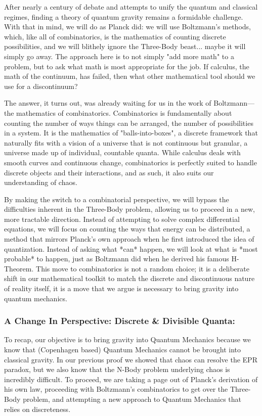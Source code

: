 \documentclass{article}
\begin{document}
After nearly a century of debate and attempts to unify the quantum and classical regimes, finding a theory of quantum gravity remains a formidable challenge. With that in mind, we will do as Planck did: we will use Boltzmann's methods, which, like all of combinatorics, is the mathematics of counting discrete possibilities, and we will blithely ignore the Three-Body beast... maybe it will simply go away. The approach here is to not simply "add more math" to a problem, but to ask what math is most appropriate for the job. If calculus, the math of the continuum, has failed, then what other mathematical tool should we use for a discontinuum?

The answer, it turns out, was already waiting for us in the work of Boltzmann—the mathematics of combinatorics. Combinatorics is fundamentally about counting the number of ways things can be arranged, the number of possibilities in a system. It is the mathematics of "balls-into-boxes", a discrete framework that naturally fits with a vision of a universe that is not continuous but granular, a universe made up of individual, countable quanta. While calculus deals with smooth curves and continuous change, combinatorics is perfectly suited to handle discrete objects and their interactions, and as such, it also suits our understanding of chaos.

By making the switch to a combinatorial perspective, we will bypass the difficulties inherent in the Three-Body problem, allowing us to proceed in a new, more tractable direction. Instead of attempting to solve complex differential equations, we will focus on counting the ways that energy can be distributed, a method that mirrors Planck's own approach when he first introduced the idea of quantization. Instead of asking what *can* happen, we will look at what is *most probable* to happen, just as Boltzmann did when he derived his famous H-Theorem. This move to combinatorics is not a random choice; it is a deliberate shift in our mathematical toolkit to match the discrete and discontinuous nature of reality itself, it is a move that we argue is necessary to bring gravity into quantum mechanics.

\subsubsection*{A Change In Perspective: Discrete \& Divisible Quanta:}
To recap, our objective is to bring gravity into Quantum Mechanics because we know that (Copenhagen based) Quantum Mechanics cannot be brought into classical gravity. In our previous proof we showed that chaos can resolve the EPR paradox, but we also know that the N-Body problem underlying chaos is incredibly difficult. To proceed, we are taking a page out of Planck's derivation of his own law, proceeding with Boltzmann's combinatorics to get over the Three-Body problem, and attempting a new approach to Quantum Mechanics that relies on discreteness.
\end{document}
